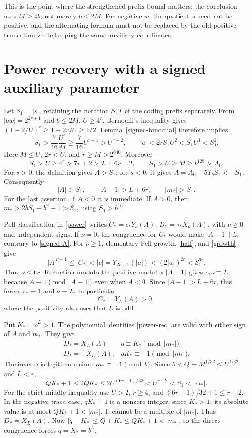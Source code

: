 \documentclass[11pt]{article}
\begin{document}
This is the point where the strengthened prefix bound matters:
the conclusion uses \(M\ge4b\), not merely \(b\le2M\).
For negative \(w\), the quotient \(s\) need not be positive,
and the alternating formula must not be replaced by the old positive
truncation while keeping the same auxiliary coordinates.

\section{Power recovery with a signed auxiliary parameter}

Let \(S_1=|s|\), retaining the notation \(S,T\) of the coding
prefix separately. From \(|bw|=2^{2r+1}\) and \(b\le2M\),
\(U\ge4^r\). Bernoulli's inequality gives
\((1-2/U)^r\ge1-2r/U\ge1/2\). Lemma~\ref{signed-binomial}
therefore implies
\begin{equation}\label{growth}
 S_1>\frac7{16}\frac{U^r}{M}
 \ge\frac7{16}U^{r-1}>U^{r-2},\qquad
 |a|<2rS_1U^2<S_1U^3<S_1^2.
\end{equation}
Here \(M\le U\), \(2r<U\), and \(r\ge M>2^{640}\).
Moreover
\[
 S_1>U\ge4^r>7r+2>L+6r+2,\qquad
 S_1>U\ge M\ge b^{128}>A_0.
\]
For \(s>0\), the definition gives \(A>S_1\); for \(s<0\),
it gives \(A=A_0-5T_bS_1<-S_1\). Consequently
\begin{equation}\label{signed-A}
 |A|>S_1,\qquad |A-1|>L+6r,\qquad |m_*|>S_1.
\end{equation}
For the last assertion, if \(A<0\) it is immediate. If \(A>0\),
then \(m_*>2bS_1-b^2-1>S_1\), using \(S_1>b^{16}\).

Pell classification in \eqref{power} writes
\(C_*=\epsilon_*Y_\nu(A)\), \(D_*=\tau_*X_\nu(A)\),
with \(\nu\ge0\) and independent signs. If \(\nu=0\), the
congruence for \(C_*\) would make \(|A-1|\mid L\), contrary
to \eqref{signed-A}. For \(\nu\ge1\), elementary Pell growth,
\eqref{half}, and \eqref{growth} give
\[
 |A|^{\nu-1}\le|C_*|<|c|
 =Y_{2r+1}(|a|)<(2|a|)^{2r}<S_1^{6r}.
\]
Thus \(\nu\le6r\). Reduction modulo the positive modulus
\(|A-1|\) gives \(\epsilon_*\nu\equiv L\), because
\(A\equiv1\pmod{|A-1|}\) even when \(A<0\). Since
\(|A-1|>L+6r\), this forces \(\epsilon_*=1\) and \(\nu=L\).
In particular
\[
                  C_*=Y_L(A)>0,
\]
where the positivity also uses that \(L\) is odd.

Put \(K_*=b^L>1\). The polynomial identities \eqref{power-rec}
are valid with either sign of \(A\) and \(m_*\). They give
\[
 \begin{array}{ll}
 D_*=X_L(A):&q\equiv K_*\pmod{|m_*|},\\
 D_*=-X_L(A):&qK_*\equiv-1\pmod{|m_*|}.
 \end{array}
\]
The inverse is legitimate since \(m_*\equiv-1\pmod b\).
Since \(b<Q=M^{1/32}\le U^{1/32}\) and \(L<r\),
\[
 QK_*+1\le2QK_*\le2U^{(6r+1)/32}
 <U^{r-2}<S_1<|m_*|.
\]
For the strict middle inequality use \(U>2\), \(r\ge4\), and
\((6r+1)/32+1\le r-2\). In the negative trace case,
\(qK_*+1\) is a nonzero integer, since \(K_*>1\); its absolute
value is at most \(QK_*+1<|m_*|\). It cannot be a multiple
of \(|m_*|\). Thus \(D_*=X_L(A)\). Now
\(|q-K_*|\le Q+K_*\le QK_*+1<|m_*|\), so the direct
congruence forces \(q=K_*=b^L\).
\end{document}
